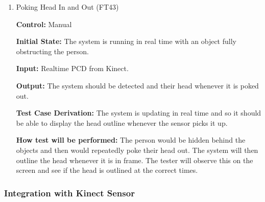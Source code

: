 \documentclass[12pt, titlepage]{article}
\begin{document}
\begin{enumerate}
  \item{Poking Head In and Out (FT43)}

  \textbf{Control:} Manual

  \textbf{Initial State:} The system is running in real time with an object fully obstructing the person.

  \textbf{Input:} Realtime PCD from Kinect.

  \textbf{Output:} The system should be detected and their head whenever it is poked out.

  \textbf{Test Case Derivation:} The system is updating in real time and so it should be able to display the head outline whenever the sensor picks it up.

  \textbf{How test will be performed:} The person would be hidden behind the objects and then would repeatedly poke their head out. The system will then outline the head whenever it is in frame. The tester will observe this on the screen and see if the head is outlined at the correct times.
\end{enumerate} 

\subsubsection{Integration with Kinect Sensor}
\end{document}
